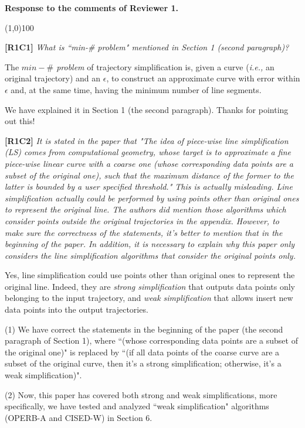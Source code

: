 \documentclass{letter}
\newcommand{\ie}{\emph{i.e.,}\xspace}
\begin{document}
\textbf{Response to the comments of Reviewer 1.}

\line(1,0){100}


\textbf{[R1C1]} \emph{What is ``min-\# problem" mentioned in Section 1 (second paragraph)?}


The \emph{$min-\#$ problem} of trajectory simplification is, given a curve (\ie an original trajectory) and an $\epsilon$, to construct an approximate curve with error within $\epsilon$ and, at the same time, having the minimum number of line segments.

We have explained it in Section 1 (the second paragraph). 
Thanks for pointing out this!

\textbf{[R1C2]} \emph{It is stated in the paper that "The idea of piece-wise line simplification (LS) comes from computational geometry, whose target is to approximate a fine piece-wise linear curve with a coarse one (whose corresponding data points are a subset of the original one), such that the maximum distance of the former to the latter is bounded by a user specified threshold." This is actually misleading. Line simplification actually could be performed by using points other than original ones to represent the original line. The authors did mention those algorithms which consider points outside the original trajectories in the appendix. However, to make sure the correctness of the statements, it's better to mention that in the beginning of the paper. In addition, it is necessary to explain why this paper only considers the line simplification algorithms that consider the original points only. }

Yes, line simplification could use points other than original ones to represent the original line. Indeed, they are \emph{strong simplification} that outputs data points only belonging to the input trajectory, and \emph{weak simplification} that allows insert new data points into the output trajectories.

(1) We have correct the statements in the beginning of the paper (the second paragraph of Section 1), where ``(whose corresponding data points are a subset of the original one)" is replaced by ``(if all data points of the coarse curve are a subset of the original curve, then it's a strong simplification; otherwise, it's a weak simplification)".

(2) Now, this paper has covered both strong and weak simplifications, more specifically, we have tested and analyzed ``weak simplification" algorithms (OPERB-A and CISED-W) in Section 6. 
\end{document}
